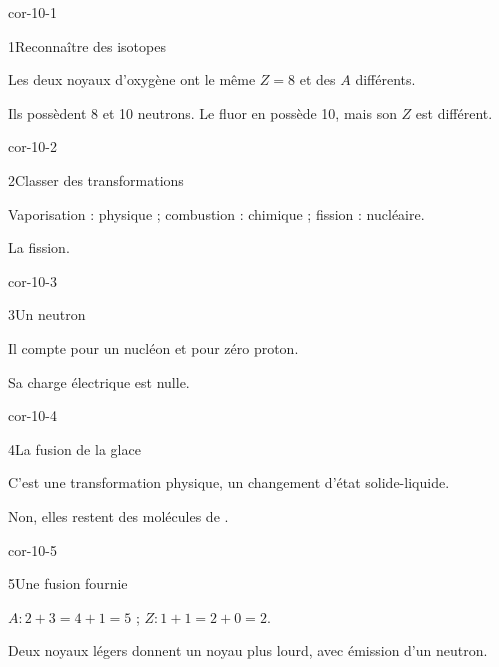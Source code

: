 \clearpage{}
\corrigesSouples
\begin{blocLivre}{cor-10-1}\begin{corrige}{1}{Reconnaître des isotopes}
\begin{questions}
\item Les deux noyaux d’oxygène ont le même $Z=8$ et des $A$ différents.
\item Ils possèdent 8 et 10 neutrons. Le fluor en possède 10, mais son $Z$ est différent.
\end{questions}
\end{corrige}\end{blocLivre}
\begin{blocLivre}{cor-10-2}\begin{corrige}{2}{Classer des transformations}
\begin{questions}
\item Vaporisation : physique ; combustion : chimique ; fission : nucléaire.
\item La fission.
\end{questions}
\end{corrige}\end{blocLivre}
\begin{blocLivre}{cor-10-3}\begin{corrige}{3}{Un neutron}
\begin{questions}
\item Il compte pour un nucléon et pour zéro proton.
\item Sa charge électrique est nulle.
\end{questions}
\end{corrige}\end{blocLivre}
\begin{blocLivre}{cor-10-4}\begin{corrige}{4}{La fusion de la glace}
\begin{questions}
\item C’est une transformation physique, un changement d’état solide-liquide.
\item Non, elles restent des molécules de .
\end{questions}
\end{corrige}\end{blocLivre}
\begin{blocLivre}{cor-10-5}\begin{corrige}{5}{Une fusion fournie}
\begin{questions}
\item $A : 2+3=4+1=5$ ; $Z : 1+1=2+0=2$.
\item Deux noyaux légers donnent un noyau plus lourd, avec émission d’un neutron.
\end{questions}
\end{corrige}\end{blocLivre}
